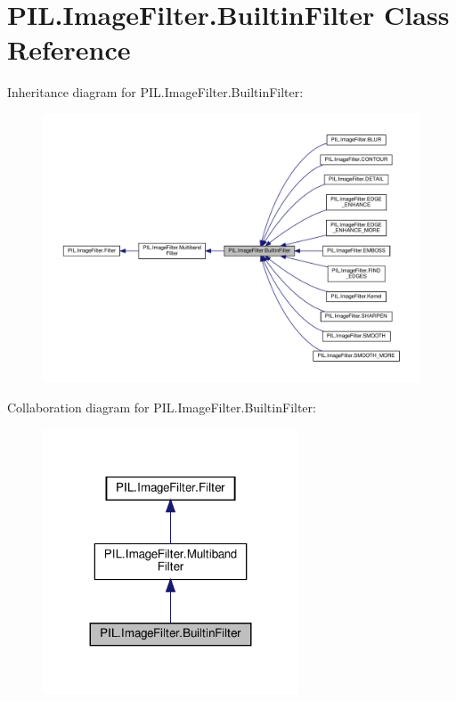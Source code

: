 \hypertarget{classPIL_1_1ImageFilter_1_1BuiltinFilter}{}\section{P\+I\+L.\+Image\+Filter.\+Builtin\+Filter Class Reference}
\label{classPIL_1_1ImageFilter_1_1BuiltinFilter}


Inheritance diagram for P\+I\+L.\+Image\+Filter.\+Builtin\+Filter\+:
\nopagebreak
\begin{figure}[H]
\begin{center}
\leavevmode
\includegraphics[width=350pt]{classPIL_1_1ImageFilter_1_1BuiltinFilter__inherit__graph}
\end{center}
\end{figure}


Collaboration diagram for P\+I\+L.\+Image\+Filter.\+Builtin\+Filter\+:
\nopagebreak
\begin{figure}[H]
\begin{center}
\leavevmode
\includegraphics[width=215pt]{classPIL_1_1ImageFilter_1_1BuiltinFilter__coll__graph}
\end{center}
\end{figure}

